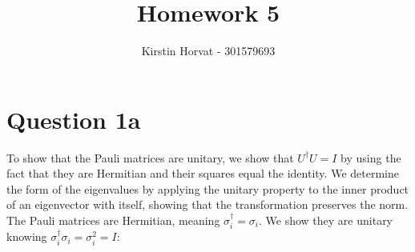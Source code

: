 \documentclass{article}
\title{Homework 5}
\author{Kirstin Horvat - 301579693}
\begin{document}
\maketitle

\section*{Question 1a}

To show that the Pauli matrices are unitary, we show that $U^\dagger U = I$ by using the fact that they are Hermitian and their squares equal the identity.
We determine the form of the eigenvalues by applying the unitary property to the inner product of an eigenvector with itself, showing that the transformation preserves the norm. \\

The Pauli matrices are Hermitian, meaning $\sigma_i^\dagger = \sigma_i$. We show they are unitary knowing $\sigma_i^\dagger \sigma_i = \sigma_i^2 = I$: \\
\end{document}
